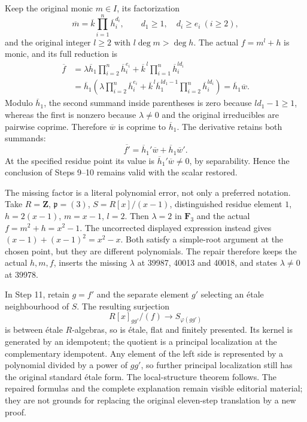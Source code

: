 Keep the original monic \(m\in I\), its factorization \[
\overline m=\overline k\prod_{i=1}^n\overline h_i^{d_i},
\qquad d_1\ge1,\quad d_i\ge e_i\ (i\ge2),
\] and the original integer \(l\ge2\) with \(l\deg m>\deg h\). The actual \(f=m^l+h\) is monic, and its full reduction is \[
\begin{aligned}
\overline f
&=\lambda\overline h_1\prod_{i=2}^n\overline h_i^{e_i}
 +\overline k^{\,l}\prod_{i=1}^n\overline h_i^{ld_i}\\
&=\overline h_1
\left(
\lambda\prod_{i=2}^n\overline h_i^{e_i}
+\overline k^{\,l}\overline h_1^{ld_1-1}
 \prod_{i=2}^n\overline h_i^{ld_i}
\right)
=\overline h_1\overline w.
\end{aligned}
\] Modulo \(\overline h_1\), the second summand inside parentheses is zero because \(ld_1-1\ge1\), whereas the first is nonzero because \(\lambda\ne0\) and the original irreducibles are pairwise coprime. Therefore \(\overline w\) is coprime to \(\overline h_1\). The derivative retains both summands: \[
\overline{f'}=\overline h_1'\overline w+\overline h_1\overline w'.
\] At the specified residue point its value is \(\overline h_1'\overline w\ne0\), by separability. Hence the conclusion of Steps 9--10 remains valid with the scalar restored.

The missing factor is a literal polynomial error, not only a preferred notation. Take \(R=\mathbf Z\), \(\mathfrak p=(3)\), \(S=R[x]/(x-1)\), distinguished residue element \(1\), \(h=2(x-1)\), \(m=x-1\), \(l=2\). Then \(\lambda=2\) in \(\mathbf F_3\) and the actual \(f=m^2+h=x^2-1\). The uncorrected displayed expression instead gives \((x-1)+(x-1)^2=x^2-x\). Both satisfy a simple-root argument at the chosen point, but they are different polynomials. The repair therefore keeps the actual \(h,m,f\), inserts the missing \(\lambda\) at 39987, 40013 and 40018, and states \(\lambda\ne0\) at 39978.

In Step 11, retain \(g=f'\) and the separate element \(g'\) selecting an étale neighbourhood of \(S\). The resulting surjection \[
R[x]_{gg'}/(f)\longrightarrow S_{\varphi(gg')}
\] is between étale \(R\)-algebras, so is étale, flat and finitely presented. Its kernel is generated by an idempotent; the quotient is a principal localization at the complementary idempotent. Any element of the left side is represented by a polynomial divided by a power of \(gg'\), so further principal localization still has the original standard étale form. The local-structure theorem follows. The repaired formulas and the complete explanation remain visible editorial material; they are not grounds for replacing the original eleven-step translation by a new proof.

